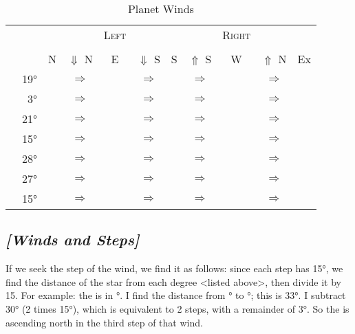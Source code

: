 \begin{table}[h]
\caption{Planet Winds}
\vspace{-1em}
\begin{center}
\begin{tiny}
\begin{tabular}{c r c c c c c c c c c}
\toprule
&   &   	& 
			& \textsc{Left} 
			&  
			& 
			& 
			& \textsc{Right} 
			& 
			& \\
&   &  	&
			& \Square
			&
			& \Opposition
			&
			& \Square
			&
			& \\
\toprule
&   		& \textsc{N}
			& $\Downarrow$ \textsc{N} 
			& \textsc{E}
			& $\Downarrow$ \textsc{S} 
			& \textsc{S}
			& $\Uparrow$ \textsc{S}
			& \textsc{W}
			& $\Uparrow$ \textsc{N} 
			& Ex \\
\toprule
\Sun 		&	19° 	& \Aries 	 	& $\Rightarrow$ 
							& \Cancer		& $\Rightarrow$ 
							& \Libra		& $\Rightarrow$
							& \Capricorn	& $\Rightarrow$	
							& \Aries		\\
\Moon 		&	3°		& \Taurus		& $\Rightarrow$
							& \Leo			& $\Rightarrow$
							& \Scorpio 	& $\Rightarrow$ 
							& \Aquarius	& $\Rightarrow$ 
							& \Taurus 	\\
\Saturn		& 21° 	& \Libra		& $\Rightarrow$
							& \Capricorn	& $\Rightarrow$
							& \Aries		& $\Rightarrow$
							& \Cancer 	& $\Rightarrow$
							& \Libra \\									
\Jupiter		& 15° 	& \Cancer		& $\Rightarrow$
							& \Libra		& $\Rightarrow$
							& \Capricorn	& $\Rightarrow$
							& \Aries		& $\Rightarrow$
							& \Cancer		\\		
\Mars		& 28°	& \Capricorn	& $\Rightarrow$
							& \Aries		& $\Rightarrow$
							& \Cancer		& $\Rightarrow$
							& \Libra		& $\Rightarrow$
							& \Capricorn 		\\	
\Venus	 	& 27°	& \Pisces		& $\Rightarrow$
							& \Gemini		& $\Rightarrow$
							& \Virgo		& $\Rightarrow$
							& \Sagittarius	& $\Rightarrow$
							& \Pisces	\\
\Mercury 	& 15°	& \Virgo		& $\Rightarrow$
							& \Sagittarius & $\Rightarrow$
							& \Pisces		& $\Rightarrow$
							& \Gemini		& $\Rightarrow$
							& \Virgo		\\										
\bottomrule
\end{tabular}
\end{tiny}
\end{center}
\end{table}
\vspace{-1em}
\subsection{\textit{[Winds and Steps]}}
If we seek the step of the wind, we find it as follows: since each step has 15°, we find the distance of the star from each degree <listed above>, then divide it by 15. For example: the \Sun\xspace is in \Aquarius\xspace 22°. I find the distance from \Capricorn\xspace 19° to \Aquarius\xspace 22°; this is 33°. I subtract 30° (2 times 15°), which is equivalent to 2 steps, with a remainder of 3°. So the \Sun\xspace is ascending north in the third step of that wind.

